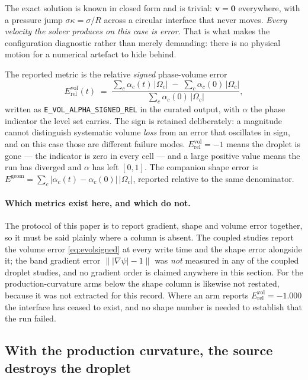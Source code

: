 \documentclass[preprint,3p,11pt]{elsarticle}
\newcommand{\psilev}{\psi}
\newcommand{\gradpsi}{\lvert\nabla\psilev\rvert}
\begin{document}
The exact solution is known in closed form and is trivial: $\mathbf{v} = \mathbf{0}$
everywhere, with a pressure jump $\sigma\kappa = \sigma/R$ across a circular
interface that never moves. \emph{Every velocity the solver produces on this case
is error.} That is what makes the configuration diagnostic rather than merely
demanding: there is no physical motion for a numerical artefact to hide behind.

The reported metric is the relative \emph{signed} phase-volume error
\begin{equation}
  E^{\mathrm{vol}}_{\mathrm{rel}}(t) \;=\;
  \frac{\sum_c \alpha_c(t)\,|\Omega_c| \;-\; \sum_c \alpha_c(0)\,|\Omega_c|}
       {\sum_c \alpha_c(0)\,|\Omega_c|},
  \label{eq:evolsigned}
\end{equation}
written as \texttt{E\_VOL\_ALPHA\_SIGNED\_REL} in the curated output, with
$\alpha$ the phase indicator the level set carries. The sign is retained
deliberately: a magnitude cannot distinguish systematic volume \emph{loss} from
an error that oscillates in sign, and on this case those are different failure
modes. $E^{\mathrm{vol}}_{\mathrm{rel}} = -1$ means the droplet is gone --- the
indicator is zero in every cell --- and a large positive value means the run has
diverged and $\alpha$ has left $[0,1]$. The companion shape error is
$E^{\mathrm{geom}} = \sum_c |\alpha_c(t) - \alpha_c(0)|\,|\Omega_c|$, reported
relative to the same denominator.

\paragraph{Which metrics exist here, and which do not.} The protocol of this
paper is to report gradient, shape and volume error together, so it must be said
plainly where a column is absent. The coupled studies report the volume error
\eqref{eq:evolsigned} at every write time and the shape error alongside it; the
band gradient error $\|\gradpsi - 1\|$ was \emph{not} measured in any of the
coupled droplet studies, and no gradient order is claimed anywhere in this
section. For the production-curvature arms below the shape column is likewise not
restated, because it was not extracted for this record. Where an arm reports
$E^{\mathrm{vol}}_{\mathrm{rel}} = -1.000$ the interface has ceased to exist, and
no shape number is needed to establish that the run failed.

\subsection{With the production curvature, the source destroys the droplet}
\label{sec:coupled-production}
\end{document}
